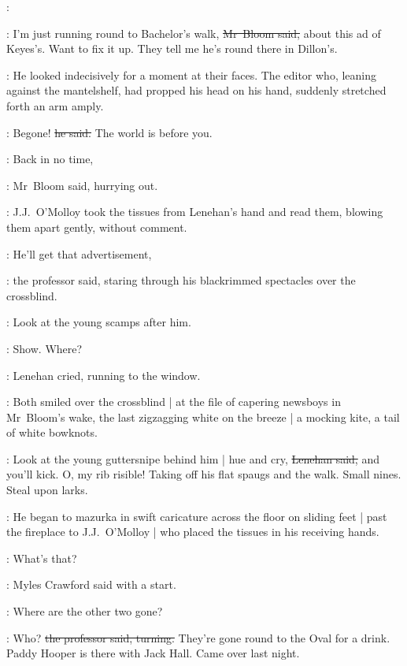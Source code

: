 \boys:



\Bloom:
I'm just running round to Bachelor's walk,
\sout{Mr~Bloom said,}
about this ad of Keyes's.
Want to fix it up.
They tell me he's round there in Dillon's.

:
He looked indecisively for a moment at their faces.
The editor
who, leaning against the mantelshelf,
had propped his head on his hand,
suddenly stretched forth an arm amply.

\crawford:
Begone!
\sout{he said.}
The world is before you.

\Bloom:
Back in no time,

:
Mr~Bloom said,
hurrying out.

:
J.J.~O'Molloy took the tissues from Lenehan's hand
and read them,
blowing them apart gently,
without comment.

\machugh:
He'll get that advertisement,

:
the professor said,
staring through his
blackrimmed spectacles over the crossblind.%

\machugh:
Look at the young scamps after him.

\lenehan:
Show.
Where?

:
Lenehan cried,
running to the window.



:
Both smiled over the crossblind |
at the file of capering newsboys in Mr~Bloom's wake,
the last zigzagging white on the breeze |
a mocking kite,
a tail of white bowknots.

\lenehan:
Look at the young guttersnipe behind him |
hue and cry,
\sout{Lenehan said,}
and you'll kick.
O, my rib risible!
Taking off his flat spaugs and the walk.
Small nines.
Steal upon larks.

:
He began to mazurka in swift caricature across the floor
on sliding feet |
past the fireplace to J.J.~O'Molloy |
who placed the tissues in his receiving hands.

\crawford:
What's that?

:
Myles Crawford said
with a start.

\crawford:
Where are the other two gone?

\machugh:
Who?
\sout{the professor said, turning.}
They're gone round to the Oval for a drink.
Paddy Hooper is there with Jack Hall.
Came over last night.


